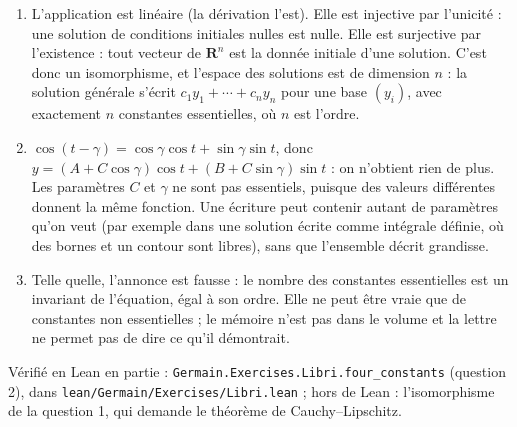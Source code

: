 \documentclass[11pt,a4paper]{article}
\begin{document}
\begin{solution}
\begin{enumerate}
\item L'application est linéaire (la dérivation l'est). Elle est injective par
  l'unicité : une solution de conditions initiales nulles est nulle. Elle est
  surjective par l'existence : tout vecteur de $\mathbf{R}^n$ est la donnée initiale
  d'une solution. C'est donc un isomorphisme, et l'espace des solutions est de
  dimension $n$ : la solution générale s'écrit $c_1y_1 + \cdots + c_ny_n$ pour une base
  $(y_i)$, avec exactement $n$ constantes essentielles, où $n$ est l'ordre.
\item $\cos(t - \gamma) = \cos\gamma\cos t + \sin\gamma\sin t$, donc
  $y = (A + C\cos\gamma)\cos t + (B + C\sin\gamma)\sin t$ : on n'obtient rien de plus.
  Les paramètres $C$ et $\gamma$ ne sont pas essentiels, puisque des valeurs
  différentes donnent la même fonction. Une écriture peut contenir autant de
  paramètres qu'on veut (par exemple dans une solution écrite comme intégrale
  définie, où des bornes et un contour sont libres), sans que l'ensemble décrit
  grandisse.
\item Telle quelle, l'annonce est fausse : le nombre des constantes essentielles est un
  invariant de l'équation, égal à son ordre. Elle ne peut être vraie que de constantes
  non essentielles ; le mémoire n'est pas dans le volume et la lettre ne permet pas de
  dire ce qu'il démontrait.
\end{enumerate}

Vérifié en Lean en partie : \texttt{Germain.Exercises.Libri.four\_constants} (question 2), dans
\texttt{lean/Germain/Exercises/Libri.lean} ; hors de Lean : l'isomorphisme de la question 1, qui demande le théorème de
Cauchy--Lipschitz.
\end{solution}
\end{document}
